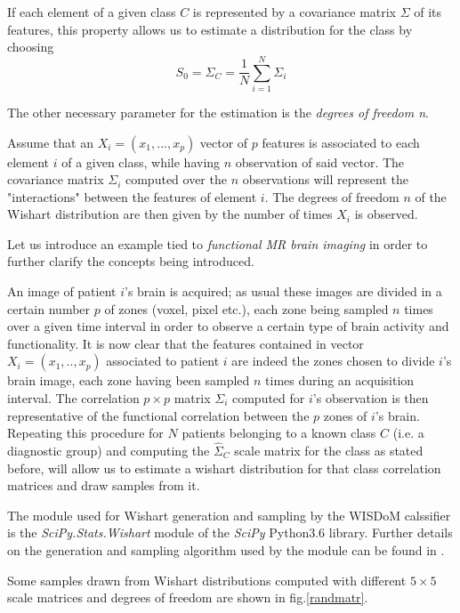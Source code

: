 \documentclass[12pt,openright,twoside,a4paper]{book}
\begin{document}
If each element of a given class $C$ is represented by a covariance matrix $\Sigma$ of its features, this property allows us to estimate a distribution for the class by choosing 
\begin{equation}
S_0=\hat{\Sigma}_C=\frac{1}{N}\sum_{i=1}^N \Sigma_i
\label{Class-Scale}
\end{equation}


The other necessary parameter for the estimation is the \textit{degrees of freedom n}.

Assume that an $X_i=(x_1, ..., x_p)$ vector of $p$ features is associated to each element $i$ of a given class, while having $n$ observation of said vector. The covariance matrix $\Sigma_i$ computed over the $n$ observations will represent the "interactions" between the features of element $i$.
The degrees of freedom  $n$ of the Wishart distribution are then given by the number of times $X_i$ is observed.

Let us introduce an example tied to \textit{functional MR brain imaging } in order to further clarify the concepts being introduced. 

An image of patient $i$'s brain is acquired; as usual these images are divided in a certain number $p$ of zones (voxel, pixel etc.), each zone being sampled $n$ times over a given time interval in order to observe a certain type of brain activity and functionality.
It is now clear that the features contained in vector $X_i=(x_1,..,x_p)$ associated to patient $i$ are indeed the zones chosen to divide $i$'s brain image, each zone having been sampled $n$ times during an acquisition interval.
The correlation $p \times p$ matrix $\Sigma_i$ computed for $i$'s observation is then representative of the functional correlation between the $p$ zones of $i$'s brain.
Repeating this procedure for $N$ patients belonging to a known class $C$ (i.e. a diagnostic group) and computing the $\hat{\Sigma}_C$ scale matrix for the class as stated before, will allow us to estimate a wishart distribution for that class correlation matrices and draw samples from it.

The module used for Wishart generation and sampling by the WISDoM calssifier is the \textit{SciPy.Stats.Wishart} module of the \textit{SciPy} Python3.6 library.
Further details on the generation and sampling algorithm used  by the module can be found in \cite{WishGen}.

Some  samples drawn from Wishart distributions computed with different  $5 \times 5$ scale matrices and degrees of freedom are shown in fig.\ref{randmatr}.
\end{document}
